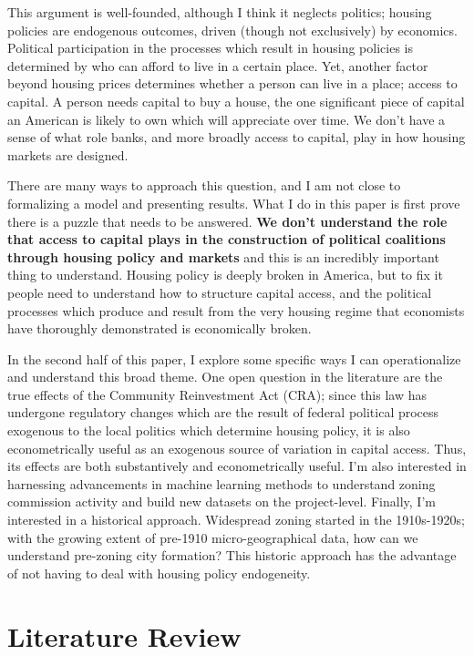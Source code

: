 \documentclass{article}[11pt]
\begin{document}
This argument is well-founded, although I think it neglects politics; housing policies are endogenous outcomes, driven (though not exclusively) by economics. Political participation in the processes which result in housing policies is determined by who can afford to live in a certain place. Yet, another factor beyond housing prices determines whether a person can live in a place; access to capital. A person needs capital to buy a house, the one significant piece of capital an American is likely to own which will appreciate over time. We don't have a sense of what role banks, and more broadly access to capital, play in how housing markets are designed. 

There are many ways to approach this question, and I am not close to formalizing a model and presenting results. What I do in this paper is first prove there is a puzzle that needs to be answered. \textbf{We don't understand the role that access to capital plays in the construction of political coalitions through housing policy and markets} and this is an incredibly important thing to understand. Housing policy is deeply broken in America, but to fix it people need to understand how to structure capital access, and the political processes which produce and result from the very housing regime that economists have thoroughly demonstrated is economically broken. 

In the second half of this paper, I explore some specific ways I can operationalize and understand this broad theme. One open question in the literature are the true effects of the Community Reinvestment Act (CRA); since this law has undergone regulatory changes which are the result of federal political process exogenous to the local politics which determine housing policy, it is also econometrically useful as an exogenous source of variation in capital access. Thus, its effects are both substantively and econometrically useful. I'm also interested in harnessing advancements in machine learning methods to understand zoning commission activity and build new datasets on the project-level. Finally, I'm interested in a historical approach. Widespread zoning started in the 1910s-1920s; with the growing extent of pre-1910 micro-geographical data, how can we understand pre-zoning city formation? This historic approach has the advantage of not having to deal with housing policy endogeneity.

\section{Literature Review}
\end{document}
